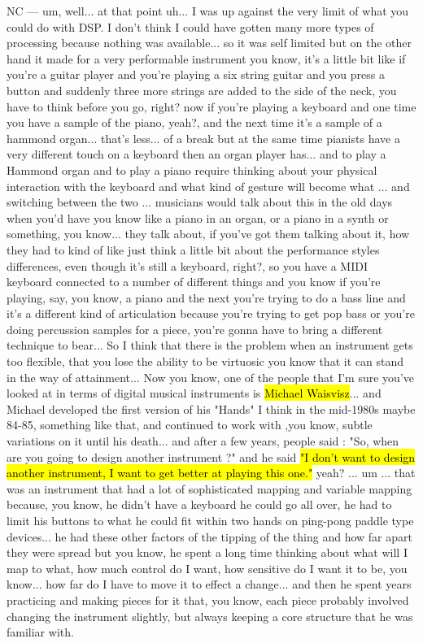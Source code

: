 NC — um, well... at that point uh... I was up against the very limit of what you could do with DSP. I don't think I could have gotten many more types of processing because nothing was available... so it was self limited but on the other hand it made for a very performable instrument you know, it's a little bit like if you're a guitar player and you're playing a six string guitar and you press a button and suddenly three more strings are added to the side of the neck, you have to think before you go, right? now if you're playing a keyboard and one time you have a sample of the piano, yeah?, and the next time it's a sample of a hammond organ... that's less... of a break but at the same time pianists have a very different touch on a keyboard then an organ player has... and to play a Hammond organ and to play a piano require thinking about your physical interaction with the keyboard and what kind of gesture will become what ...  and switching between the two ... musicians would talk about this in the old days when you'd have you know like a piano in an organ, or a piano in a synth or something, you know... they talk about, if you've got them talking about it, how they had to kind of like just think a little bit about the performance styles differences, even though it's still a keyboard, right?, so you have a MIDI keyboard connected to a number of different things and you know if you're playing, say, you know, a piano and the next you're trying to do a bass line and it's a different kind of articulation because you're trying to get pop bass or you're doing percussion samples for a piece, you're gonna have to bring a different technique to bear... So I think that there is the problem when an instrument gets too flexible, that you lose the ability to be virtuosic you know that it can stand in the way of attainment... Now you know, one of the people that I'm sure you've looked at in terms of digital musical instruments is \hl{Michael Waisvisz}... and Michael developed the first version of his "Hands" I think in the mid-1980s maybe 84-85, something like that, and continued to work with ,you know, subtle variations on it until his death... and after a few years, people said : "So, when are you going to design another instrument ?" and he said \hl{"I don't want to design another instrument,  I want to get better at playing this one."} yeah? ... um ... that was  an instrument that had a lot of sophisticated mapping and variable mapping because, you know, he didn't have a keyboard he could go all over, he had to limit his buttons to what he could fit within two hands on  ping-pong paddle type devices... he had these other factors of the tipping of the thing and how far apart they were spread but you know, he spent a long time thinking about what will I map to what, how much control do I want, how sensitive do I want it to be, you know... how far do I have to move it to effect a change... and then he spent years practicing and making pieces for it that, you know, each piece probably involved changing the instrument slightly, but always keeping a core structure that he was familiar with. 

